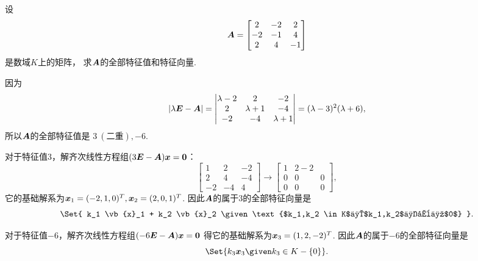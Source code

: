 \begin{example}
设\begin{equation*}
	\boldsymbol{A} = \begin{bmatrix}
		2 & -2 & 2 \\
		-2 & -1 & 4 \\
		2 & 4 & -1
	\end{bmatrix}
\end{equation*}是数域\(K\)上的矩阵，
求\(\boldsymbol{A}\)的全部特征值和特征向量.
\begin{solution}
因为\begin{equation*}
	\abs{\lambda\boldsymbol{E}-\boldsymbol{A}}
	= \begin{vmatrix}
		\lambda-2 & 2 & -2 \\
		2 & \lambda+1 & -4 \\
		-2 & -4 & \lambda+1
	\end{vmatrix}
	= (\lambda-3)^2 (\lambda+6),
\end{equation*}
所以\(\boldsymbol{A}\)的全部特征值是
\(3\ (\text{二重}),-6\).

对于特征值\(3\)，解齐次线性方程组\((3\boldsymbol{E}-\boldsymbol{A}) \boldsymbol{x} = \boldsymbol0\)：\begin{equation*}
	\begin{bmatrix}
		1 & 2 & -2 \\
		2 & 4 & -4 \\
		-2 & -4 & 4
	\end{bmatrix}
	\to \begin{bmatrix}
		1 & 2 -2 \\
		0 & 0 & 0 \\
		0 & 0 & 0
	\end{bmatrix},
\end{equation*}
它的基础解系为\(\boldsymbol{x}_1 = (-2,1,0)^T,
\boldsymbol{x}_2 = (2,0,1)^T\).
因此\(\boldsymbol{A}\)的属于\(3\)的全部特征向量是\begin{equation*}
	\Set{
		k_1 \vb{x}_1 + k_2 \vb{x}_2
		\given
		\text{$k_1,k_2 \in K$且$k_1,k_2$不全为$0$}
	}.
\end{equation*}

对于特征值\(-6\)，解齐次线性方程组\((-6\boldsymbol{E}-\boldsymbol{A}) \boldsymbol{x} = \boldsymbol0\)
得它的基础解系为\(\boldsymbol{x}_3 = (1,2,-2)^T\).
因此\(\boldsymbol{A}\)的属于\(-6\)的全部特征向量是\begin{equation*}
	\Set{
		k_3 \vb{x}_3
		\given
		k_3 \in K-\{0\}
	}.
\end{equation*}
\end{solution}
\end{example}

